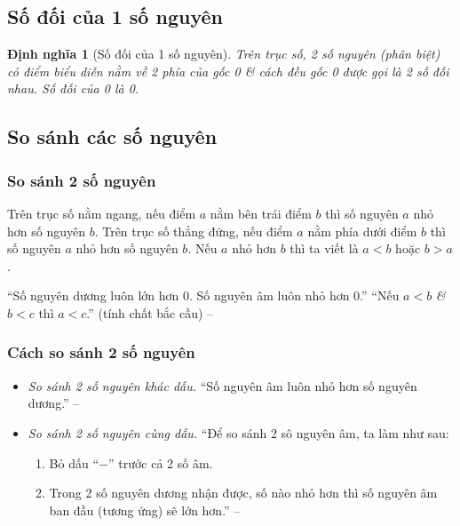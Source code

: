 \documentclass[oneside]{book}
\numberwithin{equation}{section}
\newtheorem{dinhnghia}{Định nghĩa}[section]
\begin{document}
\subsection{Số đối của 1 số nguyên}

\begin{dinhnghia}[Số đối của 1 số nguyên]
	Trên trục số, 2 số nguyên (phân biệt) có điểm biểu diễn nằm về 2 phía của gốc 0 \textit{\&} cách đều gốc 0 được gọi là \emph{2 số đối nhau}. Số đối của 0 là 0.
\end{dinhnghia}

\subsection{So sánh các số nguyên}

\subsubsection{So sánh 2 số nguyên}
\begin{tcolorbox}
	Trên trục số nằm ngang, nếu điểm $a$ nằm bên trái điểm $b$ thì số nguyên $a$ nhỏ hơn số nguyên $b$. Trên trục số thẳng đứng, nếu điểm $a$ nằm phía dưới điểm $b$ thì số nguyên $a$ nhỏ hơn số nguyên $b$. Nếu $a$ nhỏ hơn $b$ thì ta viết là $a < b$ hoặc $b > a$.
\end{tcolorbox}
``Số nguyên dương luôn lớn hơn 0. Số nguyên âm luôn nhỏ hơn 0.'' ``Nếu $a < b$ \textit{\&} $b < c$ thì $a < c$.'' (tính chất bắc cầu) -- \cite[p. 67]{Thai_Anh_Dat_Ha_Loan_Nam_Quang_Toan_6_tap_1}

\subsubsection{Cách so sánh 2 số nguyên}
\begin{itemize}
	\item \textit{So sánh 2 số nguyên khác dấu.} ``Số nguyên âm luôn nhỏ hơn số nguyên dương.'' -- \cite[p. 68]{Thai_Anh_Dat_Ha_Loan_Nam_Quang_Toan_6_tap_1}
	\item \textit{So sánh 2 số nguyên cùng dấu.} ``Để so sánh 2 sô nguyên âm, ta làm như sau:
	\begin{enumerate}
		\item Bỏ dấu ``$-$'' trước cả 2 số âm.
		\item Trong 2 số nguyên dương nhận được, số nào nhỏ hơn thì số nguyên âm ban đầu (tương ứng) sẽ lớn hơn.'' -- \cite[p. 69]{Thai_Anh_Dat_Ha_Loan_Nam_Quang_Toan_6_tap_1}
	\end{enumerate}
\end{itemize}
\end{document}
